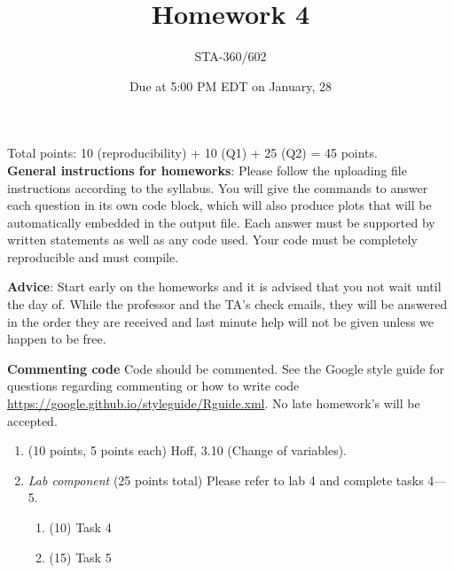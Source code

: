 \documentclass{article}
\begin{document}
\title{Homework 4}
\author{STA-360/602}
\date{Due at 5:00 PM EDT on January, 28}
\maketitle

Total points: 10 (reproducibility) + 10 (Q1) + 25 (Q2) = 45 points. \\

\textbf{General instructions for homeworks}: Please follow the uploading file instructions according to the syllabus. You will give the commands to answer each question in its own code block, which will also produce plots that will be automatically embedded in the output file. Each answer must be supported by written statements as well as any code used. Your code must be completely reproducible and must compile. 

\textbf{Advice}: Start early on the homeworks and it is advised that you not wait until the day of. While the professor and the TA's check emails, they will be answered in the order they are received and last minute help will not be given unless we happen to be free.  

\textbf{Commenting code}
Code should be commented. See the Google style guide for questions regarding commenting or how to write 
code \url{https://google.github.io/styleguide/Rguide.xml}. No late homework's will be accepted.


\begin{enumerate}
\item (10 points, 5 points each) Hoff, 3.10 (Change of variables). 


\item {\em Lab component} 
  (25 points total) Please refer to lab 4 and complete tasks 4---5. 
  \begin{enumerate}
  \item (10) Task 4
  \item (15) Task 5
  \end{enumerate}
  
\end{enumerate}
\end{document}
